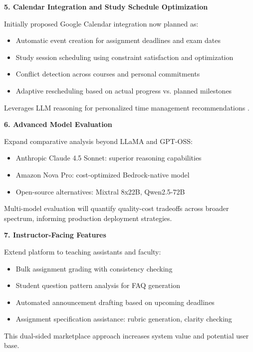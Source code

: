 \documentclass{article}
\begin{document}
\textbf{5. Calendar Integration and Study Schedule Optimization}

Initially proposed Google Calendar integration now planned as:

\begin{itemize}
\item Automatic event creation for assignment deadlines and exam dates
\item Study session scheduling using constraint satisfaction and optimization
\item Conflict detection across courses and personal commitments
\item Adaptive rescheduling based on actual progress vs. planned milestones
\end{itemize}

Leverages LLM reasoning for personalized time management recommendations \cite{anthropic2025multiagent}.

\textbf{6. Advanced Model Evaluation}

Expand comparative analysis beyond LLaMA and GPT-OSS:

\begin{itemize}
\item Anthropic Claude 4.5 Sonnet: superior reasoning capabilities
\item Amazon Nova Pro: cost-optimized Bedrock-native model
\item Open-source alternatives: Mixtral 8x22B, Qwen2.5-72B
\end{itemize}

Multi-model evaluation will quantify quality-cost tradeoffs across broader spectrum, informing production deployment strategies.

\textbf{7. Instructor-Facing Features}

Extend platform to teaching assistants and faculty:

\begin{itemize}
\item Bulk assignment grading with consistency checking
\item Student question pattern analysis for FAQ generation
\item Automated announcement drafting based on upcoming deadlines
\item Assignment specification assistance: rubric generation, clarity checking
\end{itemize}

This dual-sided marketplace approach increases system value and potential user base.
\end{document}
